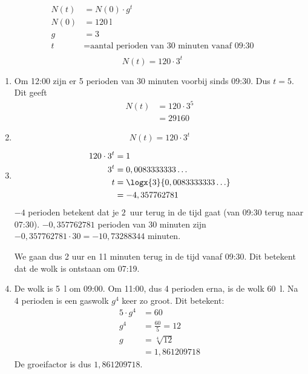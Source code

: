 \begin{antwoord}{18}
\begin{align*}
N(t) &= N(0) \cdot g^t \\ 
N(0) &= \SI{120}{\litre}\\
g &= 3\\
t &= \text{aantal perioden van 30 minuten vanaf 09:30}\\
\end{align*}
\[
 N(t) = 120 \cdot 3^t 
\]
\begin{enumerate}
\item Om 12:00 zijn er 5 perioden van 30 minuten voorbij sinds 09:30. Dus $t=5$.
Dit geeft
\begin{align*}
  N(t) &= 120 \cdot 3^5\\ 
  &= 29160 
\end{align*}
\item 
\[
 N(t) = 120 \cdot 3^t 
\]
\item 
\begin{align*}
120 \cdot 3^t &= 1 \\
 3^t &= 0,0083333333\ldots \\
 t &= \logx{3}{0,0083333333\ldots}\\
 &= -4,357762781
\end{align*}
$- 4$ perioden betekent dat je $2$~uur terug in de tijd gaat (van 09:30 terug naar 07:30). $-0,357762781$ perioden van 30 minuten zijn $- 0,357762781 \cdot 30 = -10,73288344$ minuten. 

We gaan dus 2 uur en 11 minuten terug in de tijd vanaf 09:30.
Dit betekent dat de wolk is ontstaan om 07:19.
\item
De wolk is \SI{5}{\litre} om 09:00. Om 11:00, dus 4 perioden erna, is de wolk \SI{60}{\litre}. Na 4 perioden is een gaswolk $g^4$ keer zo groot. Dit betekent: 
\begin{align*}
 5 \cdot g^4 &= 60 \\
 g^4 &= \frac{60}{5} = 12 \\
 g &= \sqrt[4]{12}\\
 &= 1,861209718
\end{align*}
De groeifactor is dus $1,861209718$.
\end{enumerate}
\end{antwoord}


